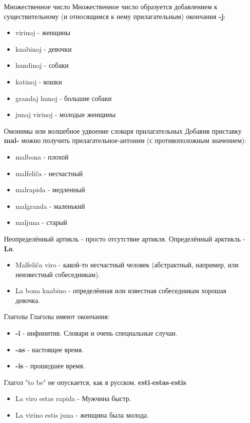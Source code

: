 \documentclass[ignorenonframetext,hyperref={pdftex,unicode}]{beamer}
\begin{document}
\begin{frame}{Множественное число}
    Множественное число образуется добавлением к существительному (и относящимся к нему прилагательным) окончания \textbf{-j}:
    \begin{itemize}
        \item virinoj - женщины
        \item knabinoj - девочки
        \item hundinoj - собаки
        \item katinoj - кошки
        \item grandaj hunoj - большие собаки
        \item junaj virinoj - молодые женщины
    \end{itemize}
\end{frame}

\begin{frame}{Омонимы или волшебное удвоение словаря прилагательных}
    Добавив приставку \textbf{mal-} можно получить прилагательное-антоним (с противоположным значением):
    \begin{itemize}
        \item malbona - плохой
        \item malfeliĉa - несчастный
        \item malrapida - медленный
        \item malgranda - маленький
        \item maljuna - старый
    \end{itemize}
\end{frame}

\begin{frame}
    Неопределённый артикль - просто отсутствие артикля. Определённый арктикль - \textbf{La}.
    \begin{itemize}
        \item Malfeliĉa viro - какой-то несчастный человек (абстрактный, например, или неизвестный собеседникам). 
        \item La bona knabino - определённая или известная собеседникам хорошая девочка.
    \end{itemize}
\end{frame}

\begin{frame}{Глаголы}
    Глаголы имеют окончания:
    \begin{itemize}
        \item<+-> \textbf{-i} - инфинитив. Словари и очень специальные случаи.
        \item<+-> \textbf{-as} - настоящее время.
        \item<+-> \textbf{-is} - прошедшее время.
    \end{itemize}
    \onslide<+-> Глагол "to be" не опускается, как в русском. \textbf{esti}-\textbf{estas}-\textbf{estis}
    \begin{itemize}
        \item<+-> La viro estas rapida - Мужчина быстр.
        \item<+-> La virino estis juna - женщина была молода.
    \end{itemize}
\end{frame}
\end{document}
